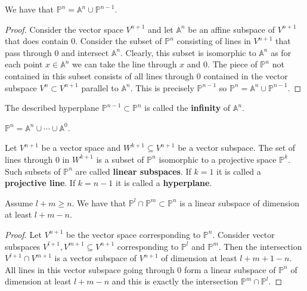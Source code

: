 \documentclass[12pt, a4paper]{article}
\renewcommand{\AA}{\mathbb A}
\newcommand{\PP}{\mathbb P}
\begin{document}
\begin{mdlemma}
    We have that \(\PP^n = \AA^n \cup \PP^{n-1}\).
\end{mdlemma}

\begin{proof}
    Consider the vector space \(V^{n+1}\) and let \(\AA^n\) be an affine subspace of \(V^{n+1}\) that does contain \(0\). Consider the subset of \(\PP^n\) consisting of lines in \(V^{n+1}\) that pass through \(0\) and intersect \(\AA^n\). Clearly, this subset is isomorphic to \(\AA^n\) as for each point \(x\in \AA^n\) we can take the line through \(x\) and \(0\). The piece of \(\PP^n\) not contained in this subset consists of all lines through \(0\) contained in the vector subspace \(V^n \subset V^{n+1}\) parallel to \(\AA^n\). This is precisely \(\PP^{n-1}\) so \(\PP^n = \AA^n \cup \PP^{n-1}\).
\end{proof}

\begin{definition}
    The described hyperplane \(\PP^{n-1}\subset \PP^n\) is called the \textbf{infinity} of \(\AA^n\).
\end{definition}

\begin{corollary}
    \(\PP^n = \AA^n \cup \cdots \cup \AA^0\).
\end{corollary}

\begin{definition}
    Let \( V^{n+1} \) be a vector space and \( W^{k+1} \subseteq V^{n+1} \) be a vector subspace. The set of lines through \(0\) in \( W^{k+1} \) is a subset of \( \mathbb{P}^n \) isomorphic to a projective space \( \mathbb{P}^k \). Such subsets of \( \mathbb{P}^n \) are called \textbf{linear subspaces}. If \( k = 1 \) it is called a \textbf{projective line}. If \( k = n - 1 \) it is called a \textbf{hyperplane}.
\end{definition}

\begin{mdprop}
    Assume \(l+m\geq n\). We have that \(\mathbb{P}^l \cap \mathbb{P}^m \subset \mathbb{P}^n\) is a linear subspace of dimension at least \(l+m-n\).
\end{mdprop}

\begin{proof}
    Let \(V^{n+1}\) be the vector space corresponding to \(\mathbb{P}^n\). Consider vector subspaces \(V^{l+1},V^{m+1} \subseteq V^{n+1}\) corresponding to \(\mathbb{P}^l\) and \(\mathbb{P}^m\). Then the intersection \(V^{l+1} \cap V^{m+1}\) is a vector subspace of \(V^{n+1}\) of dimension at least \(l + m + 1 - n\). All lines in this vector subspace going through 0 form a linear subspace of \(\mathbb{P}^n\) of dimension at least \(l + m - n\) and this is exactly the intersection \(\mathbb{P}^m \cap \mathbb{P}^l\).
\end{proof}
\end{document}
